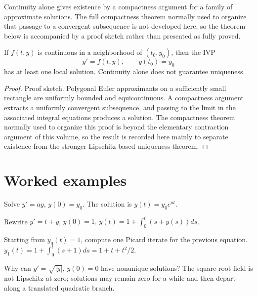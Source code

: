 \begin{remark}
Continuity alone gives existence by a compactness argument for a family of approximate solutions. The full compactness theorem normally used to organize that passage to a convergent subsequence is not developed here, so the theorem below is accompanied by a proof sketch rather than presented as fully proved.
\end{remark}

\begin{theorem}\label{thm:ii19-04}
If $f(t,y)$ is continuous in a neighborhood of $(t_0,y_0)$, then the IVP
\[
y'=f(t,y),\qquad y(t_0)=y_0
\]
has at least one local solution. Continuity alone does not guarantee uniqueness.
\begin{proof}
Proof sketch. Polygonal Euler approximants on a sufficiently small rectangle are uniformly bounded and equicontinuous. A compactness argument extracts a uniformly convergent subsequence, and passing to the limit in the associated integral equations produces a solution. The compactness theorem normally used to organize this proof is beyond the elementary contraction argument of this volume, so the result is recorded here mainly to separate existence from the stronger Lipschitz-based uniqueness theorem.
\end{proof}
\end{theorem}

\section{Worked examples}

\begin{example}\label{ex:ii19-worked-01}
Solve $y'=ay$, $y(0)=y_0$. The solution is $y(t)=y_0e^{at}$.
\end{example}

\begin{example}\label{ex:ii19-worked-02}
Rewrite $y'=t+y$, $y(0)=1$. $y(t)=1+\int_0^t(s+y(s))ds$.
\end{example}

\begin{example}\label{ex:ii19-worked-03}
Starting from $y_0(t)=1$, compute one Picard iterate for the previous equation. $y_1(t)=1+\int_0^t(s+1)ds=1+t+t^2/2$.
\end{example}

\begin{example}\label{ex:ii19-worked-04}
Why can $y'=\sqrt{|y|}$, $y(0)=0$ have nonunique solutions? The square-root field is not Lipschitz at zero; solutions may remain zero for a while and then depart along a translated quadratic branch.
\end{example}

